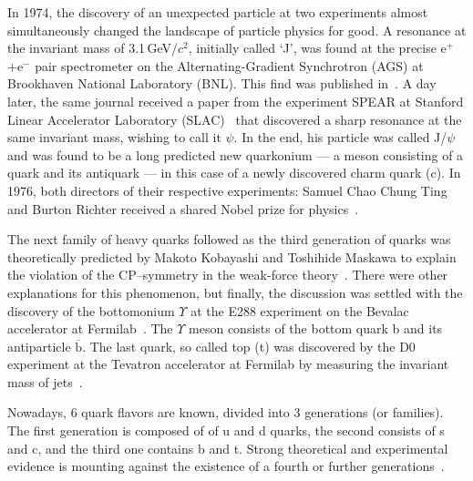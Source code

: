 In 1974, the discovery of an unexpected particle at two experiments almost simultaneously changed the landscape of particle physics for good. A resonance at the invariant mass of 3.1$\,$GeV/$c^2$, initially called `J', was found at the precise e$^+$+e$^-$ pair spectrometer on the Alternating-Gradient Synchrotron (AGS) at Brookhaven National Laboratory (BNL)\@. This find was published in~\cite{JpsiBNL}. A day later, the same journal received a paper from the experiment SPEAR at Stanford Linear Accelerator Laboratory (SLAC)~\cite{JpsiSLAC} that discovered a sharp resonance at the same invariant mass, wishing to call it $\psi$\@. In the end, his particle was called J/$\psi$ and was found to be a long predicted new quarkonium --- a meson consisting of a quark and its antiquark --- in this case of a newly discovered charm quark (c)\@. In 1976, both directors of their respective experiments: Samuel Chao Chung Ting and Burton Richter received a shared Nobel prize for physics~\cite{nobelJpsi}\@.

The next family of heavy quarks followed as the third generation of quarks was theoretically predicted by Makoto Kobayashi and Toshihide Maskawa to explain the violation of the CP--symmetry in the weak-force theory~\cite{KobayashiMaskawa}\@. There were other explanations for this phenomenon, but finally, the discussion was settled with the discovery of the bottomonium $\Upsilon$ at the E288 experiment on the Bevalac accelerator at Fermilab~\cite{bottomDiscovery}\@. The $\Upsilon$ meson consists of the bottom quark b and its antiparticle $\overline{\mathrm{b}}$\@. The last quark, so called top (t) was discovered by the D0 experiment at the Tevatron accelerator at Fermilab by measuring the invariant mass of jets~\cite{topQuark}. 

Nowadays, 6 quark flavors are known, divided into 3 generations (or families)\@. The first generation is composed of of u and d quarks, the second consists of s and c, and the third one contains b and t. Strong theoretical and experimental evidence is mounting against the existence of a fourth or further generations~\cite{fourGensPhysLettB,fourGensPRL}.

